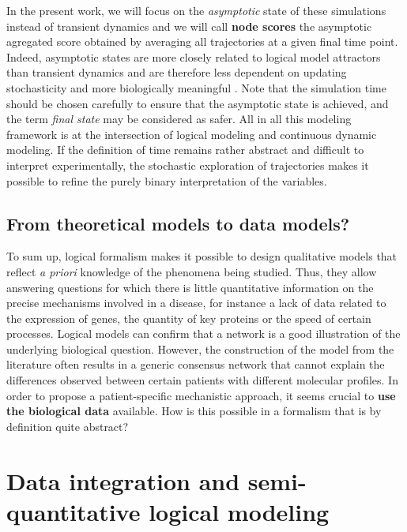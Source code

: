 \documentclass[a4paper,12pt,twoside,onecolumn,openright,final,oldfontcommands]{memoir}
\begin{document}
In the present work, we will focus on the \emph{asymptotic} state of
these simulations instead of transient dynamics and we will call
\textbf{node scores} the asymptotic agregated score obtained by
averaging all trajectories at a given final time point. Indeed,
asymptotic states are more closely related to logical model attractors
than transient dynamics and are therefore less dependent on updating
stochasticity and more biologically meaningful \citep{huang2009cancer}.
Note that the simulation time should be chosen carefully to ensure that
the asymptotic state is achieved, and the term \emph{final state} may be
considered as safer. All in all this modeling framework is at the
intersection of logical modeling and continuous dynamic modeling. If the
definition of time remains rather abstract and difficult to interpret
experimentally, the stochastic exploration of trajectories makes it
possible to refine the purely binary interpretation of the variables.

\subsection{From theoretical models to data
models?}\label{from-theoretical-models-to-data-models}

To sum up, logical formalism makes it possible to design qualitative
models that reflect \emph{a priori} knowledge of the phenomena being
studied. Thus, they allow answering questions for which there is little
quantitative information on the precise mechanisms involved in a
disease, for instance a lack of data related to the expression of genes,
the quantity of key proteins or the speed of certain processes. Logical
models can confirm that a network is a good illustration of the
underlying biological question. However, the construction of the model
from the literature often results in a generic consensus network that
cannot explain the differences observed between certain patients with
different molecular profiles. In order to propose a patient-specific
mechanistic approach, it seems crucial to \textbf{use the biological
data} available. How is this possible in a formalism that is by
definition quite abstract?

\section{Data integration and semi-quantitative logical
modeling}\label{logical-data-section}
\end{document}
